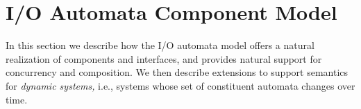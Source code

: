 \section{I/O Automata Component Model\label{component_model}}


In this section we describe how the I/O automata model offers a natural realization of components and interfaces, and provides natural support for concurrency and composition.
We then describe extensions to support semantics for \emph{dynamic systems,} i.e., systems whose set of constituent automata changes over time.

